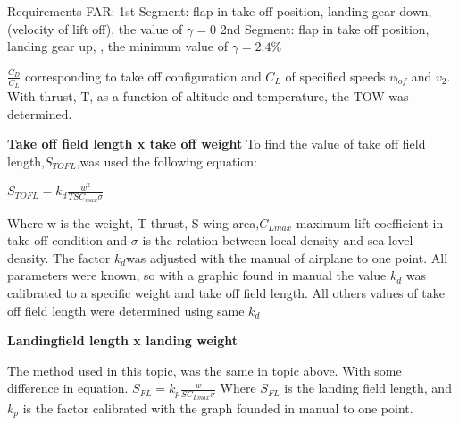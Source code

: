 	Requirements FAR:
	1st Segment: flap in take off position, landing gear down,  (velocity of lift off), the value of $\gamma = 0$
	2nd Segment: flap in take off position, landing gear up,  , the minimum value of $ \gamma = 2.4 \% $
	
	$\frac{C_{D}}{C_{L}}$ corresponding to take off configuration and $C_{L}$ of specified speeds $v_{lof}$ and $v_{2}$.
	With thrust, T, as a function of altitude and temperature, the TOW was determined.
	
\textbf{Take off field length x take off weight}
To find the value of take off field length,$S_{TOFL}$,was used the following equation:

$S_{TOFL} = k_{d}\frac{w^{2}}{TSC_{max}\sigma}$

Where w is the weight, T thrust, S wing area,$C_{Lmax}$  maximum lift coefficient in take off condition and $\sigma$ is the relation between local density and sea level density. The factor $ k_{d} $was adjusted with the manual of airplane to one point. All parameters were known, so with a graphic found in manual the value $k_{d}$ was calibrated to a specific weight and take off field length. All others values of take off field length were determined using same $k_{d}$

\textbf{Landingfield length x landing weight}

The method used in this topic, was the same in topic above. With some difference in equation.
$S_{FL}=k_{p}\frac{w}{SC_{Lmax}\sigma}$ 
Where $S_{FL}$ is the landing field length, and $k_{p}$  is the factor calibrated with the graph founded in manual to one point.
	
	

	
	
	
	
	


